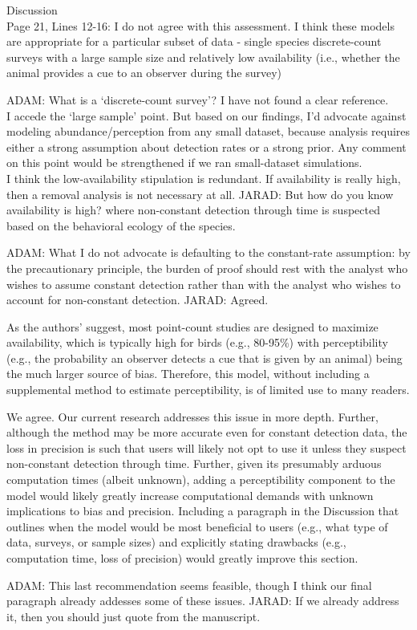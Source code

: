 \documentclass[12pt]{article}
\renewenvironment{quote}  %
              {\list{}{\rightmargin\leftmargin}\normalfont%
               \item\relax}
              {\endlist}
\newcommand{\adam}[1]{{\color{blue} ADAM: #1}}
\newcommand{\jarad}[1]{{\color{Orange} JARAD: #1}}
\begin{document}
Discussion\\
Page 21, Lines 12-16:  I do not agree with this assessment.  I think these models are appropriate for a particular subset of data - single species discrete-count surveys with a large sample size and relatively low availability (i.e., whether the animal provides a cue to an observer during the survey)   
\begin{quote}
\adam{What is a `discrete-count survey'?  I have not found a clear reference.\\
I accede the `large sample' point.  But based on our findings, I'd advocate against modeling abundance/perception from any small dataset, because analysis requires either a strong assumption about detection rates or a strong prior.  Any comment on this point would be strengthened if we ran small-dataset simulations.\\
I think the low-availability stipulation is redundant.  If availability is really high, then a removal analysis is not necessary at all.}
\jarad{But how do you know availability is high?}
\end{quote}
where non-constant detection through time is suspected based on the behavioral ecology of the species.
\begin{quote}
\adam{What I do not advocate is defaulting to the constant-rate assumption: by the precautionary principle, the burden of proof should rest with the analyst who wishes to assume constant detection rather than with the analyst who wishes to account for non-constant detection.}
\jarad{Agreed.}
\end{quote}


As the authors’ suggest, most point-count studies are designed to maximize availability, which is typically high for birds (e.g., 80-95\%) with perceptibility (e.g., the probability an observer detects a cue that is given by an animal) being the much larger source of bias.  Therefore, this model, without including a supplemental method to estimate perceptibility, is of limited use to many readers.
\begin{quote}
We agree.  Our current research addresses this issue in more depth.
\end{quote}
Further, although the method may be more accurate even for constant detection data, the loss in precision is such that users will likely not opt to use it unless they suspect non-constant detection through time.  Further, given its presumably arduous computation times (albeit unknown), adding a perceptibility component to the model would likely greatly increase computational demands with unknown implications to bias and precision.  Including a paragraph in the Discussion that outlines when the model would be most beneficial to users (e.g., what type of data, surveys, or sample sizes) and explicitly stating drawbacks (e.g., computation time, loss of precision) would greatly improve this section.  
\begin{quote}
\adam{This last recommendation seems feasible, though I think our final paragraph already addesses some of these issues.}
\jarad{If we already address it, then you should just quote from the manuscript.}
\end{quote}
\vspace{1.5cm}
\end{document}
